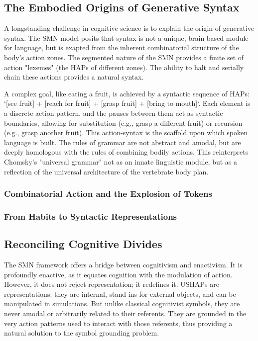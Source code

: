 \documentclass[10pt,letterpaper]{article}
\begin{document}
\subsection*{The Embodied Origins of Generative Syntax}
A longstanding challenge in cognitive science is to explain the origin of generative syntax. The SMN model posits that syntax is not a unique, brain-based module for language, but is exapted from the inherent combinatorial structure of the body's action zones. The segmented nature of the SMN provides a finite set of action "lexemes" (the HAPs of different zones). The ability to halt and serially chain these actions provides a natural syntax. 

A complex goal, like eating a fruit, is achieved by a syntactic sequence of HAPs: `[see fruit] + [reach for fruit] + [grasp fruit] + [bring to mouth]`. Each element is a discrete action pattern, and the pauses between them act as syntactic boundaries, allowing for substitution (e.g., grasp a different fruit) or recursion (e.g., grasp another fruit). This action-syntax is the scaffold upon which spoken language is built. The rules of grammar are not abstract and amodal, but are deeply homologous with the rules of combining bodily actions. This reinterprets Chomsky's "universal grammar" not as an innate linguistic module, but as a reflection of the universal architecture of the vertebrate body plan.

\subsubsection*{Combinatorial Action and the Explosion of Tokens}

\subsubsection*{From Habits to Syntactic Representations}

\subsection*{Reconciling Cognitive Divides}
The SMN framework offers a bridge between cognitivism and enactivism. It is profoundly enactive, as it equates cognition with the modulation of action. However, it does not reject representation; it redefines it. USHAPs are representations: they are internal, stand-ins for external objects, and can be manipulated in simulations. But unlike classical cognitivist symbols, they are never amodal or arbitrarily related to their referents. They are grounded in the very action patterns used to interact with those referents, thus providing a natural solution to the symbol grounding problem.
\end{document}
